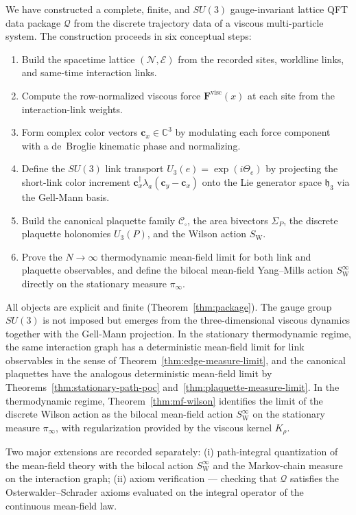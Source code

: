 \documentclass[11pt]{article}
\theoremstyle{remark}
\newcommand{\C}{\mathbb C}
\newcommand{\mcN}{\mathcal N}
\newcommand{\mcE}{\mathcal E}
\newcommand{\mathfrakh}{\mathfrak h_3}
\begin{document}
We have constructed a complete, finite, and $SU(3)$ gauge-invariant lattice QFT
data package $\mathcal Q$ from the discrete trajectory data of a viscous
multi-particle system.
The construction proceeds in six conceptual steps:
\begin{enumerate}[leftmargin=1.5em]
\item Build the spacetime lattice $(\mcN,\mcE)$ from the recorded sites,
      worldline links, and same-time interaction links.
\item Compute the row-normalized viscous force $\mathbf F^{\mathrm{visc}}(x)$
      at each site from the interaction-link weights.
\item Form complex color vectors $\mathbf c_x\in\C^3$ by modulating each force
      component with a de~Broglie kinematic phase and normalizing.
\item Define the $SU(3)$ link transport $U_3(e)=\exp(i\Theta_e)$ by projecting
      the short-link color increment
      $\mathbf c_x^\dagger\lambda_a(\mathbf c_y-\mathbf c_x)$ onto the Lie
      generator space $\mathfrakh$ via the Gell-Mann basis.
\item Build the canonical plaquette family $\mathcal C_\square$, the area
      bivectors $\Sigma_P$, the discrete plaquette holonomies $U_3(P)$, and
      the Wilson action $S_{\mathrm W}$.
\item Prove the $N\to\infty$ thermodynamic mean-field limit for both link and
      plaquette observables, and define the bilocal mean-field Yang--Mills action
      $S_{\mathrm W}^\infty$ directly on the stationary measure $\pi_\infty$.
\end{enumerate}
All objects are explicit and finite (Theorem~\ref{thm:package}).
The gauge group $SU(3)$ is not imposed but emerges from the three-dimensional
viscous dynamics together with the Gell-Mann projection.
In the stationary thermodynamic regime, the same interaction graph has a
deterministic mean-field limit for link observables in the sense of
Theorem~\ref{thm:edge-measure-limit}, and the canonical plaquettes have the
analogous deterministic mean-field limit by
Theorems~\ref{thm:stationary-path-poc} and~\ref{thm:plaquette-measure-limit}.
In the thermodynamic regime, Theorem~\ref{thm:mf-wilson} identifies the limit of
the discrete Wilson action as the bilocal mean-field action $S_{\mathrm W}^\infty$
on the stationary measure $\pi_\infty$, with regularization provided by the
viscous kernel $K_\rho$.

Two major extensions are recorded separately:
(i) path-integral quantization of the mean-field theory with the bilocal action
$S_{\mathrm W}^\infty$ and the Markov-chain measure on the interaction graph;
(ii) axiom verification --- checking that $\mathcal Q$ satisfies the
Osterwalder--Schrader axioms evaluated on the integral operator of the continuous
mean-field law.



\end{document}
